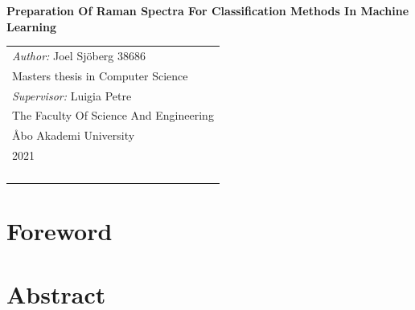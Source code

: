 \documentclass[a4paper, 12pt, oneside]{book}
\begin{document}
\pagestyle{empty}    
\begingroup
{}


\begin{titlepage}
\vspace*{144pt}
\begin{center}
\Huge\bf Preparation Of Raman Spectra For Classification Methods In Machine Learning


\end{center}
\enlargethispage{3cm}
\vfill

\hfill
\begin{tabular}[t]{l@{}}%
\textit{Author:} Joel Sjöberg 38686\\ %
Masters thesis in Computer Science\\ %
\textit{Supervisor:} Luigia Petre\\ %
The Faculty Of Science And Engineering\\ %
Åbo Akademi University\\ 
2021\\ %
\\
\\
\\
\\
\end{tabular}
\end{titlepage}


\tableofcontents 


\endgroup %

\clearpage
\pagestyle{plain}      
\chapter*{Foreword}


\chapter*{Abstract}

\end{document}
